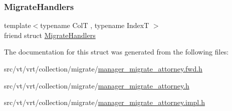 \subsubsection{\texorpdfstring{Migrate\+Handlers}{MigrateHandlers}}
{\footnotesize\ttfamily template$<$typename ColT , typename IndexT $>$ \\
friend struct \hyperlink{structvt_1_1vrt_1_1collection_1_1_migrate_handlers}{Migrate\+Handlers}\hspace{0.3cm}{\ttfamily [friend]}}



The documentation for this struct was generated from the following files\+:\begin{DoxyCompactItemize}
\item 
src/vt/vrt/collection/migrate/\hyperlink{manager__migrate__attorney_8fwd_8h}{manager\+\_\+migrate\+\_\+attorney.\+fwd.\+h}\item 
src/vt/vrt/collection/migrate/\hyperlink{manager__migrate__attorney_8h}{manager\+\_\+migrate\+\_\+attorney.\+h}\item 
src/vt/vrt/collection/migrate/\hyperlink{manager__migrate__attorney_8impl_8h}{manager\+\_\+migrate\+\_\+attorney.\+impl.\+h}\end{DoxyCompactItemize}

